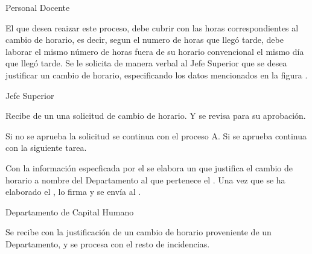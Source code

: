 \begin{PDescripcion}
    \Ppaso Personal Docente
        \begin{enumerate}
            
            \Ppaso[\itarea]  El  que desea reaizar este proceso, debe cubrir con las horas correspondientes al cambio de horario, es decir, segun el numero de horas que llegó tarde, debe laborar el mismo número de horas fuera de su horario convencional el mismo día que llegó tarde.
            \Ppaso[\itarea]  Se le solicita de manera verbal al Jefe Superior que se desea justificar un cambio de horario, especificando los datos mencionados en la figura .
        \end{enumerate}
    
    \Ppaso Jefe Superior
        \begin{enumerate}
            \Ppaso[\itarea]  Recibe de un  una solicitud de cambio de horario. Y se revisa para su aprobación. 
        \bigskip
        \begin{UClist}
  		    \UCli Si no se aprueba la solicitud se continua con el proceso A.
  		    \UCli Si se aprueba continua con la siguiente tarea.
        \end{UClist}
            \Ppaso[\itarea]  Con la información especficada por el  se elabora un  que justifica el cambio de horario a nombre del Departamento al que pertenece el . 
            \Ppaso[\itarea]  Una vez que se ha elaborado el , lo firma y se envía al .
        \end{enumerate}    
    
    \Ppaso Departamento de Capital Humano
        \begin{enumerate}
            \Ppaso[\itarea]  Se recibe  con la justificación de un cambio de horario proveniente de un Departamento, y se procesa con el resto de incidencias.
        \end{enumerate} 
    
\end{PDescripcion}
